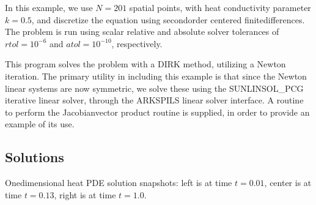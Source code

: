 \documentclass[letterpaper,10pt,english]{sphinxmanual}
\begin{document}
\sphinxAtStartPar
In this example, we use \(N=201\) spatial points, with heat
conductivity parameter \(k=0.5\), and discretize the equation
using second\sphinxhyphen{}order centered finite\sphinxhyphen{}differences.  The problem is run
using scalar relative and absolute solver tolerances of
\(rtol=10^{-6}\) and \(atol=10^{-10}\), respectively.

\sphinxAtStartPar
This program solves the problem with a DIRK method, utilizing a Newton
iteration.  The primary utility in including this example is that
since the Newton linear systems are now symmetric, we solve these
using the SUNLINSOL\_PCG iterative linear solver, through the ARKSPILS
linear solver interface.  A routine to perform the Jacobian\sphinxhyphen{}vector
product routine is supplied, in order to provide an example of its use.


\subsection{Solutions}
\label{\detokenize{c_serial:id27}}
\noindent{}

\noindent{}

\noindent{}

\sphinxAtStartPar
One\sphinxhyphen{}dimensional heat PDE solution snapshots: left is at time \(t=0.01\),
center is at time \(t=0.13\), right is at time \(t=1.0\).
\end{document}
